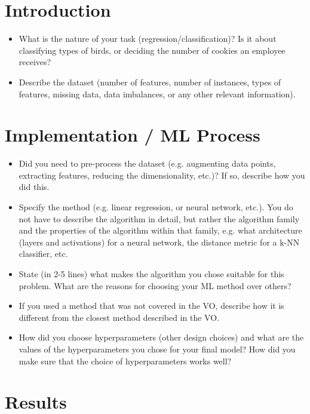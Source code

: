 \documentclass[a4, 10 pt, conference]{ieeeconf}  %
\begin{document}
\section{Introduction}
\label{sec:intro}

{\color{blue}

\begin{itemize}
	\item What is the nature of your task (regression/classification)? Is it about classifying types of birds, or deciding the number of cookies an employee receives?
	\item Describe the dataset (number of features, number of instances, types of features, missing data, data imbalances, or any other relevant information).
\end{itemize}
}


\section{Implementation / ML Process}
\label{sec:methods}

{\color{blue}

\begin{itemize}
	\item Did you need to pre-process the dataset (e.g. augmenting data points, extracting features, reducing the dimensionality, etc.)? If so, describe how you did this.
	\item Specify the method (e.g. linear regression, or neural network, etc.). You do not have to describe the algorithm in detail, but rather the algorithm family and the properties of the algorithm within that family, e.g. what architecture (layers and activations) for a neural network, the distance metric for a k-NN classifier, etc. 
	\item State (in 2-5 lines) what makes the algorithm you chose suitable for this problem. What are the reasons for choosing your ML method over others?
    \item If you used a method that was not covered in the VO, describe how it is different from the closest method described in the VO.
	\item How did you choose hyperparameters (other design choices) and what are the values of the hyperparameters you chose for your final model? How did you make sure that the choice of hyperparameters works well?
\end{itemize}
}

\section{Results}
\label{sec:results}
\end{document}
